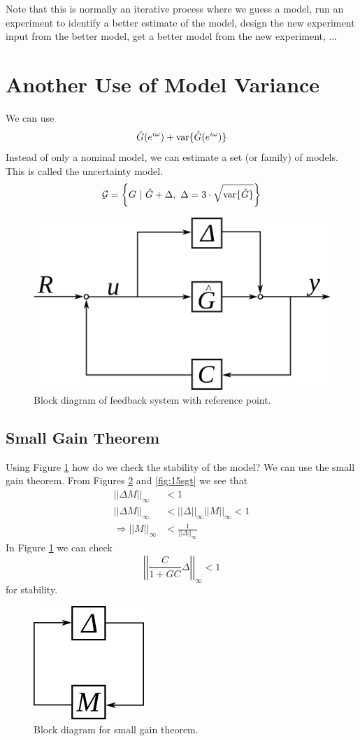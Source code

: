 Note that this is normally an iterative process where we guess a model, run an experiment to identify a better estimate of the model, design the new experiment input from the better model, get a better model from the new experiment, ...

\section{Another Use of Model Variance}
We can use
$$\hat{G}(e^{i\omega}) + \text{var}\{\hat{G}(e^{i\omega})\}$$
Instead of only a nominal model, we can estimate a set (or family) of models. This is called the uncertainty model.
$$\mathcal{G} = \left\lbrace G ~|~ \hat{G}+\Delta, ~\Delta=3\cdot\sqrt{\text{var}\{\hat{G}\}}\right\rbrace$$

\begin{figure}[ht!]
	\centering
	\includegraphics[width=.3\textwidth]{images/15bd}
	\caption{Block diagram of feedback system with reference point.}
	\label{fig:15bd}
\end{figure}

\subsection{Small Gain Theorem}
\label{sec:15sgt}
Using Figure \ref{fig:15bd} how do we check the stability of the model? We can use the small gain theorem. From Figures \ref{fig:15sgtbd} and \ref{fig:15sgt} we see that
\begin{align*}
||\Delta M||_\infty &< 1 \\
||\Delta M||_\infty &< ||\Delta||_\infty||M||_\infty < 1 \\
\Rightarrow ||M||_\infty &< \frac{1}{||\Delta||_\infty}
\end{align*}
In Figure \ref{fig:15bd} we can check
$$\left|\left|\frac{C}{1+GC}\Delta\right|\right|_\infty < 1$$
for stability.

\begin{figure}[ht!]
	\centering
	\includegraphics[width=.1\textwidth]{images/15sgtbd}
	\caption{Block diagram for small gain theorem.}
	\label{fig:15sgtbd}
\end{figure}

